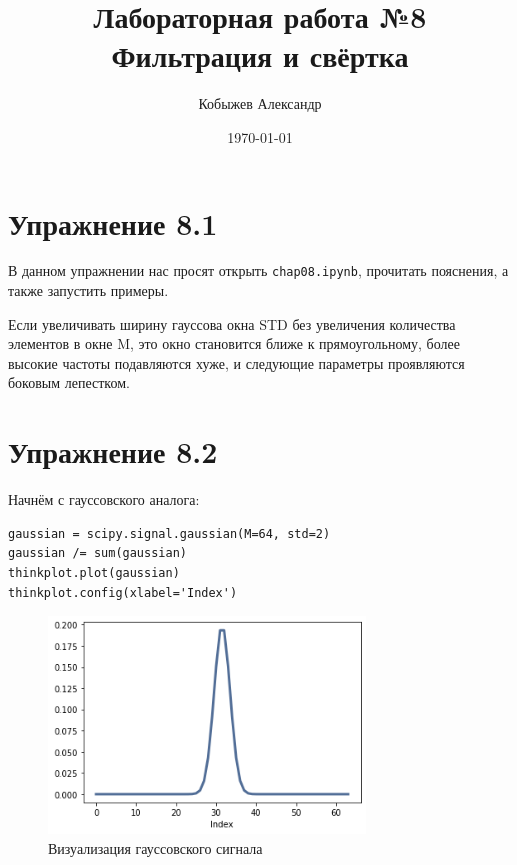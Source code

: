 \documentclass[a4paper,12pt]{report}
\title{Лабораторная работа №8\\Фильтрация и свёртка}
\author{Кобыжев Александр}
\date{\today}
\begin{document}
\maketitle
\tableofcontents
\listoffigures
\lstlistoflistings

\maketitle

\chapter{Упражнение 8.1}

В данном упражнении нас просят открыть \texttt{chap08.ipynb}, прочитать пояснения, а также запустить примеры. 

Если увеличивать ширину гауссова окна STD без увеличения количества элементов в окне M, это окно становится ближе к прямоугольному, более высокие частоты подавляются хуже, и следующие параметры проявляются боковым лепестком.

\chapter{Упражнение 8.2}

Начнём с гауссовского аналога:

\begin{lstlisting}[caption=Визуализация гауссовского сигнала]
gaussian = scipy.signal.gaussian(M=64, std=2)
gaussian /= sum(gaussian)
thinkplot.plot(gaussian)
thinkplot.config(xlabel='Index')
\end{lstlisting}

\begin{figure}[H]
        \centering
        \includegraphics[width=0.75\textwidth]{lab8_fig2_1.png}
        \caption{Визуализация гауссовского сигнала}
        \label{fig:lab8_fig2_1}
\end{figure}
\end{document}
